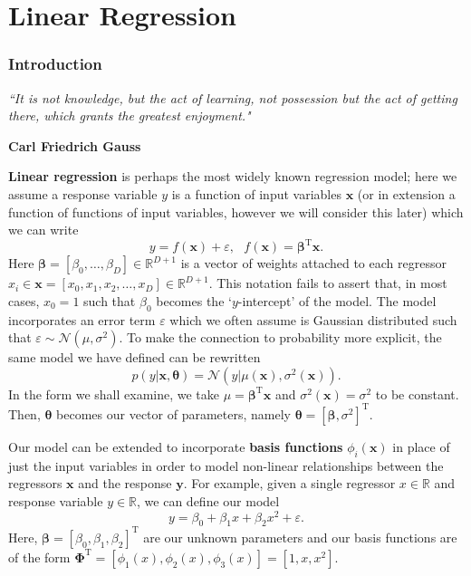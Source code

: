 \documentclass[10pt,a4paper]{article}
\numberwithin{equation}{section}
\theoremstyle{plain}
\theoremstyle{own}
\begin{document}
\part{Linear Regression}
\section{Introduction} \label{reg:intro}
\epigraph{\textit{``It is not knowledge, but the act of learning, not possession but the act of getting there, which grants the greatest enjoyment."}}{\textbf{Carl Friedrich Gauss}}
\textbf{Linear regression} is perhaps the most widely known regression model; here we assume a response variable $y$ is a function of input variables $\mathbf{x}$ (or in extension a function of functions of input variables, however we will consider this later) which we can write
\begin{equation}
y = f(\mathbf{x}) + \varepsilon,~~~ f(\mathbf{x}) = \boldsymbol\beta^{\text{T}}\mathbf{x}.
\end{equation}
Here $\boldsymbol\beta = \left[ \beta_0, \ldots, \beta_D \right] \in \mathbb{R}^{D+1}$ is a vector of weights attached to each regressor $x_i \in \mathbf{x} = \left[ x_0, x_1, x_2, \ldots, x_D \right] \in \mathbb{R}^{D+1}$. This notation fails to assert that, in most cases, $x_0 = 1$ such that $\beta_0$ becomes the `$y$-intercept' of the model. The model incorporates an error term $\varepsilon$ which we often assume is Gaussian distributed such that $\varepsilon \sim \mathcal{N}(\mu, \sigma^2)$. To make the connection to probability more explicit, the same model we have defined can be rewritten
\begin{equation}
p(y| \mathbf{x}, \boldsymbol\theta) = \mathcal{N}(y|\mu(\mathbf{x}), \sigma^2(\mathbf{x})).
\end{equation}
In the form we shall examine, we take $\mu = \boldsymbol\beta^{\text{T}} \mathbf{x}$ and $\sigma^2(\mathbf{x}) = \sigma^2$ to be constant. Then, $\boldsymbol\theta$ becomes our vector of parameters, namely $\boldsymbol\theta = \left[ \boldsymbol\beta, \sigma^2 \right]^{\text{T}}$.

Our model can be extended to incorporate \textbf{basis functions} $\phi_i(\mathbf{x})$ in place of just the input variables in order to model non-linear relationships between the regressors $\mathbf{x}$ and the response $\mathbf{y}$. For example, given a single regressor $x \in \mathbb{R}$ and response variable $y \in \mathbb{R}$, we can define our model
\begin{equation}
y = \beta_0 + \beta_1 x + \beta_2 x^2 + \varepsilon.
\end{equation}
Here, $\boldsymbol\beta = \left[ \beta_0, \beta_1, \beta_2 \right]^{\text{T}}$ are our unknown parameters and our basis functions are of the form $\boldsymbol\Phi^{\text{T}} = \left[ \phi_1(x), \phi_2(x), \phi_3(x) \right] = \left[ 1, x, x^2 \right]$.
\end{document}
